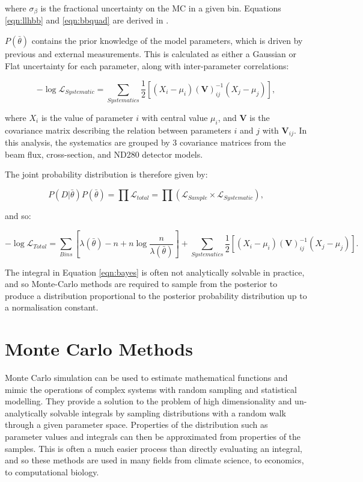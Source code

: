 where $\sigma_{\beta}$ is the fractional uncertainty on the MC in a given bin. Equations \ref{eqn:llhbb} and \ref{eqn:bbquad} are derived in \cite{beestonbarlow}.

$P(\bar{\theta})$ contains the prior knowledge of the model parameters, which is driven by previous and external measurements. This is calculated as either a Gaussian or Flat uncertainty for each parameter, along with inter-parameter correlations:

\begin{equation}
-\log\mathcal{L}_{Systematic} = \sum_{Systematics} \frac{1}{2} [(X_i - \mu_i) (\textbf{V})_{ij}^{-1} (X_j - \mu_j)],
\end{equation}\label{eqn:systllh}

where $X_i$ is the value of parameter $i$ with central value $\mu_i$, and $\textbf{V}$ is the covariance matrix describing the relation between parameters $i$ and $j$ with $\textbf{V}_{ij}$. In this analysis, the systematics are grouped by 3 covariance matrices from the beam flux, cross-section, and ND280 detector models.

The joint probability distribution is therefore given by:

\begin{equation}
P(D|\bar{\theta}) P(\bar{\theta}) = \prod \mathcal{L}_{total} = \prod (\mathcal{L}_{Sample} \times \mathcal{L}_{Systematic}),
\end{equation}

 and so:

\begin{equation}
-\log\mathcal{L}_{Total} = \sum_{Bins}[\lambda(\bar{\theta}) - n + n \log \frac{n}{\lambda(\bar{\theta})}] + \sum_{Systematics} \frac{1}{2} [(X_i - \mu_i) (\textbf{V})_{ij}^{-1} (X_j - \mu_j)].
\end{equation}

The integral in Equation \ref{eqn:bayes} is often not analytically solvable in practice, and so Monte-Carlo methods are required to sample from the posterior to produce a distribution proportional to the posterior probability distribution up to a normalisation constant. 

\section{Monte Carlo Methods}\label{sec:montecarlo}
Monte Carlo simulation can be used to estimate mathematical functions and mimic the operations of complex systems with random sampling and statistical modelling. They provide a solution to the problem of high dimensionality and un-analytically solvable integrals by sampling distributions with a random walk through a given parameter space. Properties of the distribution such as parameter values and integrals can then be approximated from properties of the samples. This is often a much easier process than directly evaluating an integral, and so these methods are used in many fields from climate science, to economics, to computational biology.

